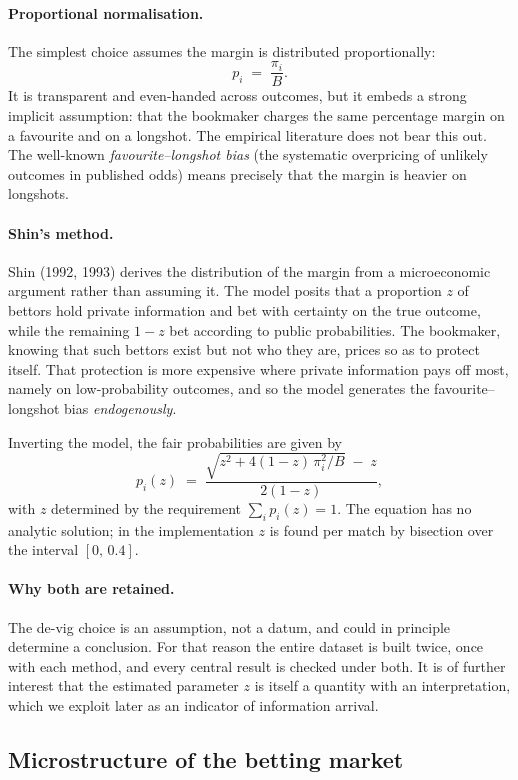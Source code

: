 \documentclass[12pt,a4paper,oneside]{report}
\renewcommand{\_}{\oldunderscore\allowbreak}
\theoremstyle{definition}
\theoremstyle{plain}
\theoremstyle{remark}
\begin{document}
\paragraph{Proportional normalisation.} The simplest choice assumes the margin is distributed
proportionally:
\[
p_i \;=\; \frac{\pi_i}{B}.
\]
It is transparent and even-handed across outcomes, but it embeds a strong implicit assumption:
that the bookmaker charges the same percentage margin on a favourite and on a longshot. The
empirical literature does not bear this out. The well-known \emph{favourite--longshot bias}
(the systematic overpricing of unlikely outcomes in published odds) means precisely that the
margin is heavier on longshots.

\paragraph{Shin's method.} Shin (1992, 1993) derives the distribution of the margin from a
microeconomic argument rather than assuming it. The model posits that a proportion $z$ of
bettors hold private information and bet with certainty on the true outcome, while the
remaining $1-z$ bet according to public probabilities. The bookmaker, knowing that such bettors
exist but not who they are, prices so as to protect itself. That protection is more expensive
where private information pays off most, namely on low-probability outcomes, and so the model
generates the favourite--longshot bias \emph{endogenously}.

Inverting the model, the fair probabilities are given by
\[
p_i(z) \;=\; \frac{\sqrt{z^2 + 4(1-z)\,\pi_i^2/B} \;-\; z}{2(1-z)},
\]
with $z$ determined by the requirement $\sum_i p_i(z) = 1$. The equation has no analytic
solution; in the implementation $z$ is found per match by bisection over the interval
$[0,\,0.4]$.

\paragraph{Why both are retained.} The de-vig choice is an assumption, not a datum, and could
in principle determine a conclusion. For that reason the entire dataset is built twice, once
with each method, and every central result is checked under both. It is of further interest
that the estimated parameter $z$ is itself a quantity with an interpretation, which we exploit
later as an indicator of information arrival.

\subsection{Microstructure of the betting market}
\label{sec:microstructure-theory}
\end{document}
